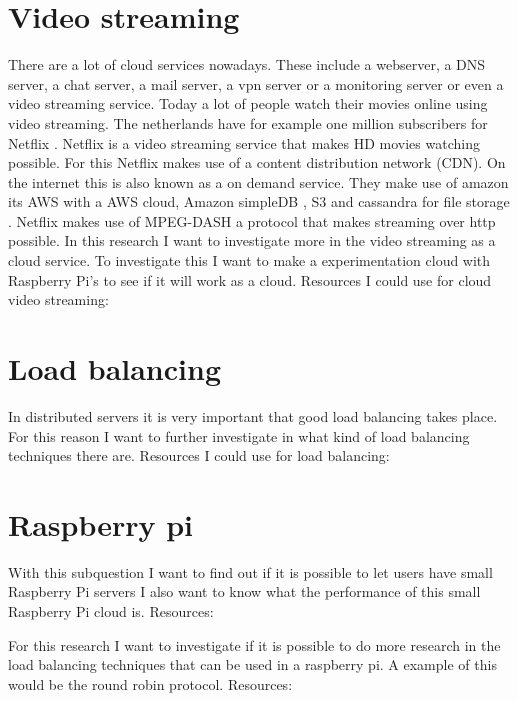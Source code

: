 \documentclass{sig-alternate-br}
\begin{document}
\section{Video streaming}
There are a lot of cloud services nowadays. These include a webserver, a DNS server, a chat server, a mail server, a vpn server or a monitoring server or even a video streaming service. 
Today a lot of people watch their movies online using video streaming. The netherlands have for example one million subscribers for Netflix \cite{volkskrant}. Netflix is a video streaming service that makes HD movies watching possible. For this Netflix makes use of a content distribution network (CDN). On the internet this is also known as a on demand service. They make use of amazon its AWS with a AWS cloud, Amazon simpleDB , S3 and cassandra for file storage \cite{Adhikari:2012}. Netflix makes use of MPEG-DASH a protocol that makes streaming over http possible. In this research I want to investigate more in the video streaming as a cloud service. 
To investigate this I want to make a experimentation cloud with Raspberry Pi's to see if it will work as a cloud. 
Resources I could use for cloud video streaming:
\cite{g-streamer,raspberry-video,video-1080p, plissonneau:2012}
 
\section{Load balancing}
In distributed servers it is very important that good load balancing takes place. For this reason I want to further investigate in what kind of load balancing techniques there are. 
Resources I could use for load balancing:
\cite{nginx-load-balancing,nginx-load-balancing-2,computer-networking,wolf:1997,load-balancing}

 
\section{Raspberry pi}
With this subquestion I want to find out if it is possible to let users have small Raspberry Pi servers I also want to know what the performance of this small Raspberry Pi cloud is. 
Resources:
\cite{Pcextreme,nginx-load-balancing,nginx-load-balancing-2}

For this research I want to investigate if it is possible to do more research in the 
load balancing techniques that can be used in a raspberry pi. A example of this would be the round robin protocol.
Resources:
\cite{nginx-load-balancing,nginx-load-balancing-2}
\end{document}
